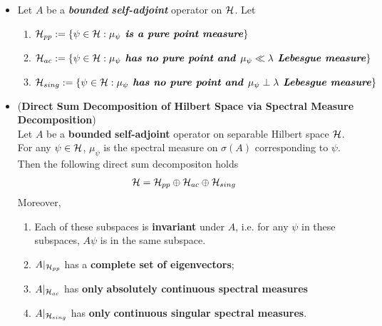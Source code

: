 \documentclass[11pt]{article}
\begin{document}
\begin{itemize}
\item \begin{definition} 
Let $A$ be a \textbf{\emph{bounded}} \emph{\textbf{self-adjoint}} operator on ${\mathcal H}$. Let  
\begin{enumerate}
\item ${\mathcal H}_{pp}:= \left\{\psi \in {\mathcal H}: \mu_{\psi} \text{\emph{\textbf{ is a pure point measure}}}\right\}$
\item ${\mathcal H}_{ac}:= \left\{\psi \in {\mathcal H}: \mu_{\psi} \text{\emph{\textbf{  has no pure point and }}} \mu_{\psi} \ll \lambda \text{\emph{\textbf{  Lebesgue measure}}}\right\}$
\item ${\mathcal H}_{sing}:= \left\{\psi \in {\mathcal H}: \mu_{\psi} \text{\emph{\textbf{  has no pure point and }}} \mu_{\psi} \perp \lambda \text{\emph{\textbf{  Lebesgue measure}}}\right\}$
\end{enumerate}
\end{definition}

\item \begin{proposition} (\textbf{Direct Sum Decomposition of Hilbert Space via Spectral Measure Decomposition}) \citep{reed1980methods}\\
Let $A$ be a \textbf{bounded} \textbf{self-adjoint} operator on separable Hilbert space ${\mathcal H}$. For any $\psi \in {\mathcal H}$, $\mu_{\psi}$ is the spectral measure on $\sigma(A)$ corresponding to $\psi$. Then the following direct sum decompositon holds
\begin{align*}
{\mathcal H} &= {\mathcal H}_{pp} \oplus {\mathcal H}_{ac} \oplus {\mathcal H}_{sing}
\end{align*}
Moreover,
\begin{enumerate}
\item Each of these subspaces is \textbf{invariant} under $A$, i.e. for any $\psi$ in these subspaces, $A \psi$ is in the same subspace.
\item $A|_{{\mathcal H}_{pp}}$ has a \textbf{complete set of eigenvectors};
\item $A|_{{\mathcal H}_{ac}}$ has \textbf{only} \textbf{absolutely continuous spectral measures} 
\item $A|_{{\mathcal H}_{sing}}$ has \textbf{only} \textbf{continuous singular spectral measures}. 
\end{enumerate}
\end{proposition}


\end{itemize}
\end{document}
